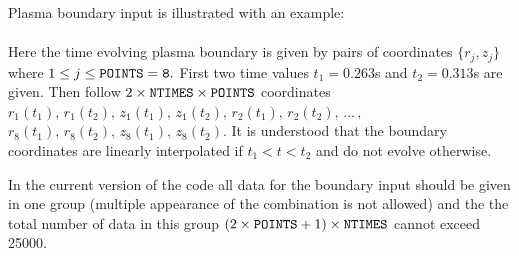 Plasma boundary input is illustrated with an example:
\\[1ex]
\\[1ex]
Here the time evolving plasma boundary is given by pairs of coordinates
$\{r_j,z_j\}$ where ${1\leq j\leq\tt POINTS=8.}$
First two time values $t_1=0.263$s and $t_2=0.313$s are given.
Then follow $2\times\tt NTIMES\times POINTS$ coordinates  
$r_1(t_1),\,r_1(t_2),\,z_1(t_1),\,z_1(t_2),\,r_2(t_1),\,r_2(t_2),\,
\dots\,,$\linebreak 
$r_8(t_1),\,r_8(t_2),\,z_8(t_1),\,z_8(t_2).$
It is understood that the boundary coordinates are linearly interpolated
if $t_1<t<t_2$ and do not evolve otherwise.

In the current version of the code all data for the boundary input
should be given in one group (multiple appearance of the combination 
 is not allowed) and the the total number of data in
this group $(2\times{\tt POINTS}+1)\times{\tt NTIMES}$ cannot exceed 25000.

